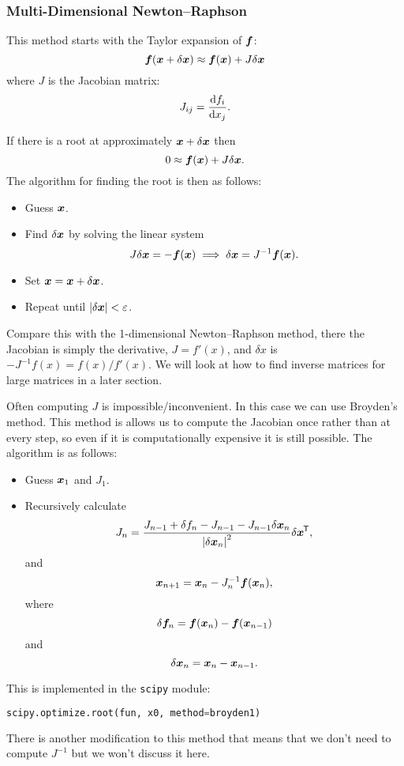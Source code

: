 \documentclass[a4paper]{article}
\begin{document}
    \subsubsection{Multi-Dimensional Newton--Raphson}
    This method starts with the Taylor expansion of \(\bm{f}\):
    \[\bm{f}(\bm{x} + \delta\bm{x}) \approx \bm{f}(\bm{x}) + J\delta\bm{x}\]
    where \(J\) is the Jacobian matrix:
    \[J_{ij} = \dv{f_i}{x_j}.\]
    
    If there is a root at approximately \(\bm{x} + \delta\bm{x}\) then
    \[0 \approx \bm{f}(\bm{x}) + J\delta\bm{x}.\]
    The algorithm for finding the root is then as follows:
    \begin{itemize}
        \item Guess \(\bm{x}\).
        \item Find \(\delta\bm{x}\) by solving the linear system
        \[J\delta\bm{x} = -\bm{f}(\bm{x}) \implies \delta\bm{x} = J^{-1}\bm{f}(\bm{x}).\]
        \item Set \(\bm{x} = \bm{x} + \delta\bm{x}\).
        \item Repeat until \(\abs{\delta\bm{x}} < \varepsilon\).
    \end{itemize}
    Compare this with the 1-dimensional Newton--Raphson method, there the Jacobian is simply the derivative, \(J = f'(x)\), and \(\delta x\) is \(-J^{-1}f(x) = f(x)/f'(x)\).
    We will look at how to find inverse matrices for large matrices in a later section.
    
    Often computing \(J\) is impossible/inconvenient.
    In this case we can use Broyden's method.
    This method is allows us to compute the Jacobian once rather than at every step, so even if it is computationally expensive it is still possible.
    The algorithm is as follows:
    \begin{itemize}
        \item Guess \(\bm{x}_1\) and \(J_1\).
        \item Recursively calculate
        \[J_n = \frac{J_{n-1} + \delta f_n - J_{n-1} - J_{n-1}\delta\bm{x}_n}{\abs{\delta\bm{x}_n}^2}\delta\bm{x}^{\mkern-1.5mu\mathsf{T}},\]
        and
        \[\bm{x}_{n+1} = \bm{x}_n - J_{n}^{-1}\bm{f}(\bm{x}_n),\]
        where
        \[\delta\bm{f}_n = \bm{f}(\bm{x}_n) - \bm{f}(\bm{x}_{n-1})\]
        and
        \[\delta\bm{x}_n = \bm{x}_n - \bm{x}_{n-1}.\]
    \end{itemize}
    This is implemented in the \lstinline[language=python]|scipy| module:
    \begin{lstlisting}[language=python]
    scipy.optimize.root(fun, x0, method=broyden1)
    \end{lstlisting}
    There is another modification to this method that means that we don't need to compute \(J^{-1}\) but we won't discuss it here.
    
\end{document}
